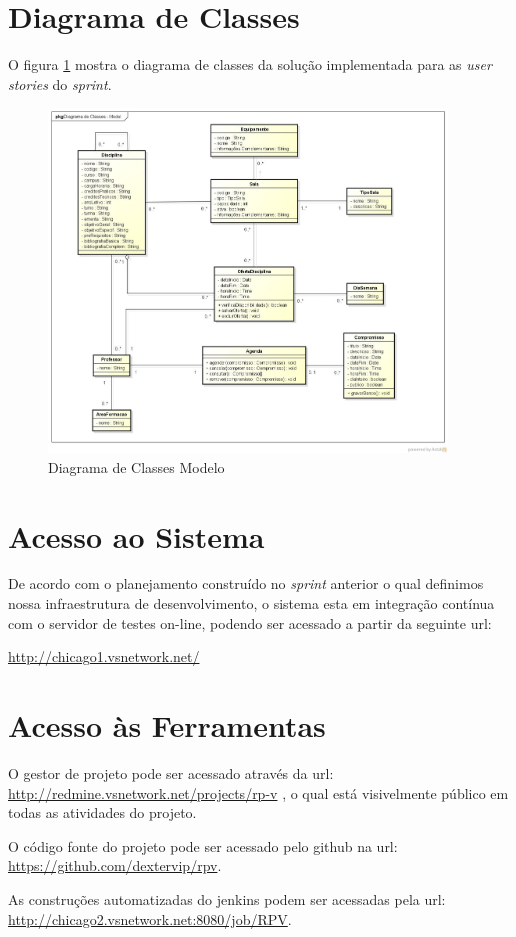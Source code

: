 \documentclass{abnt}
\begin{document}
	\clearpage
	\section{Diagrama de Classes}
		
		O figura \ref{fig:diagramaClassesModelo} mostra o diagrama de classes da solução implementada para as \emph{user stories} do \emph{sprint}.
	
		\begin{figure}[h]
			\begin{center}
				 \includegraphics[width=400px]{classesmodelo}
				 \caption{Diagrama de Classes Modelo}
				 \label{fig:diagramaClassesModelo}
			\end{center}
		\end{figure}
		\FloatBarrier

	\clearpage

	\section{Acesso ao Sistema}
			De acordo com o planejamento construído no \emph{sprint} anterior o qual definimos nossa infraestrutura de desenvolvimento, 
			o sistema esta em integração contínua com o servidor de testes on-line, podendo ser acessado a partir da seguinte url:
		
			\url{http://chicago1.vsnetwork.net/}
			

	\section{Acesso às Ferramentas}
		
		O gestor de projeto pode ser acessado através da url: \url{http://redmine.vsnetwork.net/projects/rp-v} , o qual está visivelmente público em todas as atividades do projeto. 
		
		O código fonte do projeto pode ser acessado pelo github\cite{GITHUB} na url: \url{https://github.com/dextervip/rpv}. 
		
		As construções automatizadas do jenkins podem ser acessadas pela url: \url{http://chicago2.vsnetwork.net:8080/job/RPV}.

	\clearpage

	\nocite{*}
	
			
\end{document}
